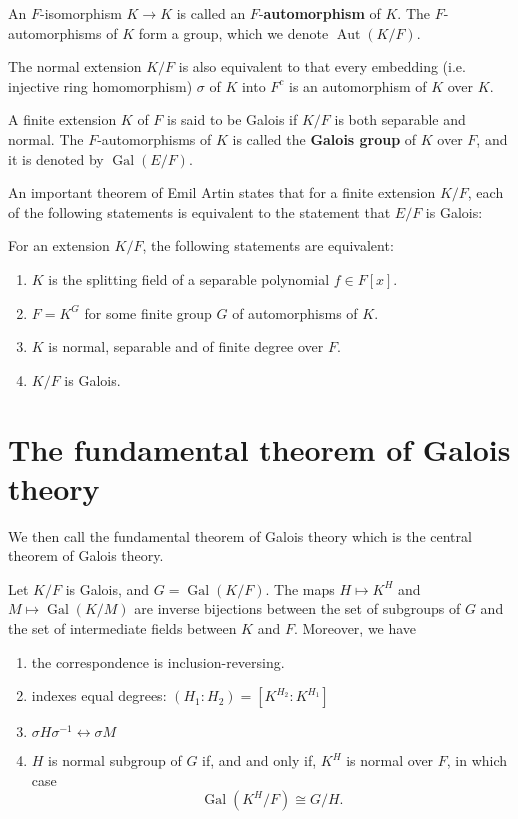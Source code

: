 An $F$-isomorphism $K\rightarrow K$ is called an $F$-\textbf{automorphism} of $K$. The $F$-automorphisms of $K$ form a group, which we denote $\operatorname{Aut}(K/F)$.

The normal extension $K/F$ is also equivalent to that every embedding (i.e. injective ring homomorphism) $\sigma$ of $K$ into $F^c$ is an automorphism of $K$ over $K$.

\begin{definition}
A finite extension $K$ of $F$ is said to be Galois if $K/F$ is both separable and normal. 
The $F$-automorphisms of $K$ is called the \textbf{Galois group} of $K$ over $F$, and it is denoted by $\operatorname{Gal}(E/F)$.
\end{definition}

An important theorem of Emil Artin \citep{artin1944galois} states that for a finite extension $K/F$, each of the following statements is equivalent to the statement that $E/F$ is Galois: 
\begin{theorem}[Artin]
For an extension $K/F$, the following statements are equivalent:
\begin{enumerate}
\item $K$ is the splitting field of a separable polynomial $f\in F[x]$.
\item $F=K^G$ for some finite group $G$ of automorphisms of $K$.
\item $K$ is normal, separable and of finite degree over $F$.
\item $K/F$ is Galois.
\end{enumerate}
\end{theorem}

\section{The fundamental theorem of Galois theory}
We then call the fundamental theorem of Galois theory which is the central theorem of Galois theory.
\begin{theorem}
Let $K/F$ is Galois, and $G=\operatorname{Gal}(K/F)$. The maps $H\mapsto K^H$ and $M\mapsto \operatorname{Gal}(K/M)$ are inverse bijections between the set of subgroups of $G$ and the set of intermediate fields between $K$ and $F$. Moreover, we have 
\begin{enumerate}
\item the correspondence is inclusion-reversing.
\item indexes equal degrees: $(H_1:H_2)=[K^{H_2}:K^{H_1}]$  
\item $\sigma H\sigma^{-1}\leftrightarrow\sigma M$
\item $H$ is normal subgroup of $G$ if, and and only if, $K^H$ is normal over $F$, in which case $$\operatorname{Gal}(K^H/F)\cong G/H.$$
\end{enumerate}
\end{theorem}

